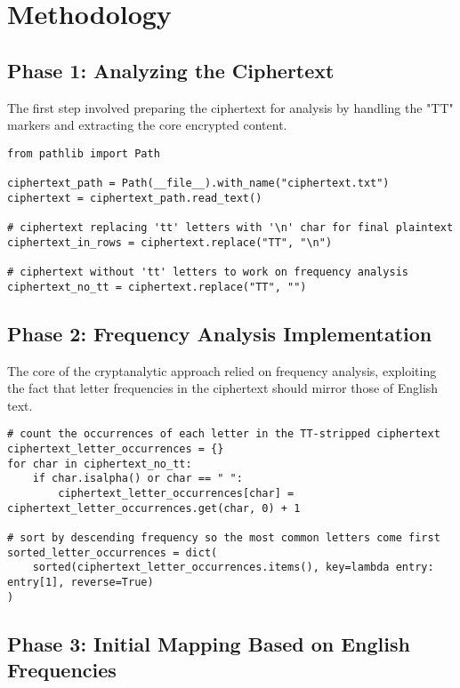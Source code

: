 \documentclass[12pt,a4paper]{article}
\begin{document}
\section{Methodology}

\subsection{Phase 1: Analyzing the Ciphertext}

The first step involved preparing the ciphertext for analysis by handling the "TT" markers and extracting the core encrypted content.

\begin{lstlisting}[caption=Initial Data Processing Code]
from pathlib import Path

ciphertext_path = Path(__file__).with_name("ciphertext.txt")
ciphertext = ciphertext_path.read_text()

# ciphertext replacing 'tt' letters with '\n' char for final plaintext
ciphertext_in_rows = ciphertext.replace("TT", "\n")

# ciphertext without 'tt' letters to work on frequency analysis
ciphertext_no_tt = ciphertext.replace("TT", "")
\end{lstlisting}

\subsection{Phase 2: Frequency Analysis Implementation}

The core of the cryptanalytic approach relied on frequency analysis, exploiting the fact that letter frequencies in the ciphertext should mirror those of English text.

\begin{lstlisting}[caption=Frequency Analysis Implementation]
# count the occurrences of each letter in the TT-stripped ciphertext
ciphertext_letter_occurrences = {}
for char in ciphertext_no_tt:
    if char.isalpha() or char == " ":
        ciphertext_letter_occurrences[char] = ciphertext_letter_occurrences.get(char, 0) + 1

# sort by descending frequency so the most common letters come first
sorted_letter_occurrences = dict(
    sorted(ciphertext_letter_occurrences.items(), key=lambda entry: entry[1], reverse=True)
)
\end{lstlisting}

\subsection{Phase 3: Initial Mapping Based on English Frequencies}
\end{document}
